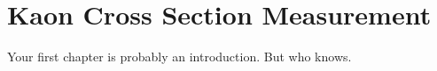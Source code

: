 \chapter{Kaon Cross Section Measurement}
Your first chapter is probably an introduction. But who knows.